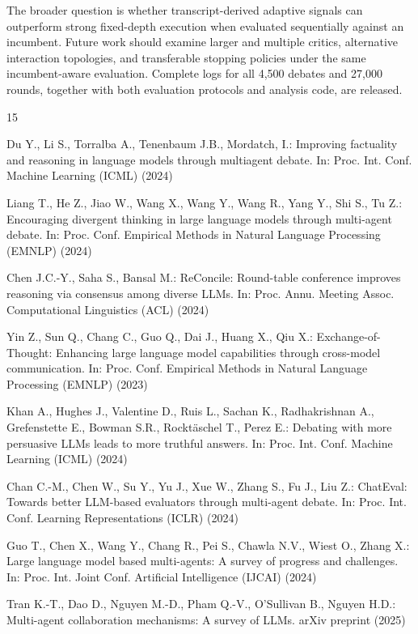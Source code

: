 \documentclass{llncs}
\begin{document}
The broader question is whether transcript-derived adaptive signals can outperform strong fixed-depth execution when evaluated sequentially against an incumbent. Future work should examine larger and multiple critics, alternative interaction topologies, and transferable stopping policies under the same incumbent-aware evaluation. Complete logs for all 4,500 debates and 27,000 rounds, together with both evaluation protocols and analysis code, are released.



\begin{thebibliography}{15}

 Du Y., Li S., Torralba A., Tenenbaum J.B., Mordatch, I.: Improving factuality and reasoning in language models through multiagent debate. In: Proc. Int. Conf. Machine Learning (ICML) (2024)

 Liang T., He Z., Jiao W., Wang X., Wang Y., Wang R., Yang Y., Shi S., Tu Z.: Encouraging divergent thinking in large language models through multi-agent debate. In: Proc. Conf. Empirical Methods in Natural Language Processing (EMNLP) (2024)

 Chen J.C.-Y., Saha S., Bansal M.: ReConcile: Round-table conference improves reasoning via consensus among diverse LLMs. In: Proc. Annu. Meeting Assoc. Computational Linguistics (ACL) (2024)

 Yin Z., Sun Q., Chang C., Guo Q., Dai J., Huang X., Qiu X.: Exchange-of-Thought: Enhancing large language model capabilities through cross-model communication. In: Proc. Conf. Empirical Methods in Natural Language Processing (EMNLP) (2023)

 Khan A., Hughes J., Valentine D., Ruis L., Sachan K., Radhakrishnan A., Grefenstette E., Bowman S.R., Rocktäschel T., Perez E.: Debating with more persuasive LLMs leads to more truthful answers. In: Proc. Int. Conf. Machine Learning (ICML) (2024)


 Chan C.-M., Chen W., Su Y., Yu J., Xue W., Zhang S., Fu J., Liu Z.: ChatEval: Towards better LLM-based evaluators through multi-agent debate. In: Proc. Int. Conf. Learning Representations (ICLR) (2024)

 Guo T., Chen X., Wang Y., Chang R., Pei S., Chawla N.V., Wiest O., Zhang X.: Large language model based multi-agents: A survey of progress and challenges. In: Proc. Int. Joint Conf. Artificial Intelligence (IJCAI) (2024)

 Tran K.-T., Dao D., Nguyen M.-D., Pham Q.-V., O'Sullivan B., Nguyen H.D.: Multi-agent collaboration mechanisms: A survey of LLMs. arXiv preprint (2025)


\end{thebibliography}
\end{document}
